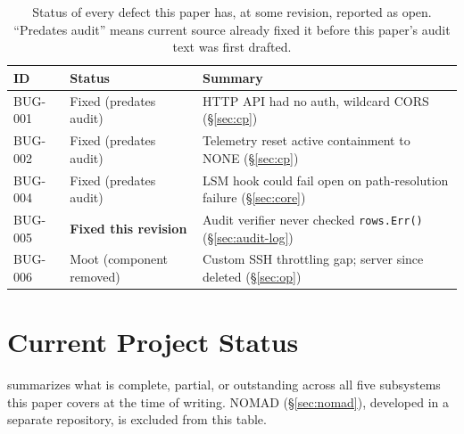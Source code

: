 \documentclass{article}
\begin{document}
\begin{table}[htbp]
\centering
\footnotesize
\caption{Status of every defect this paper has, at some revision,
reported as open. ``Predates audit'' means current source already
fixed it before this paper's audit text was first drafted.}
\label{tab:bugs}
\begin{tabular}{@{}p{1.5cm}p{1.9cm}p{3.9cm}@{}}
\toprule
ID & Status & Summary \\
\midrule
BUG-001 & Fixed (predates audit) & HTTP API had no auth, wildcard CORS (\S\ref{sec:cp}) \\
BUG-002 & Fixed (predates audit) & Telemetry reset active containment to NONE (\S\ref{sec:cp}) \\
BUG-004 & Fixed (predates audit) & LSM hook could fail open on path-resolution failure (\S\ref{sec:core}) \\
BUG-005 & \textbf{Fixed this revision} & Audit verifier never checked \texttt{rows.Err()} (\S\ref{sec:audit-log}) \\
BUG-006 & Moot (component removed) & Custom SSH throttling gap; server since deleted (\S\ref{sec:op}) \\
\bottomrule
\end{tabular}
\end{table}

\section{Current Project Status}
\label{sec:status}

 summarizes what is complete, partial, or outstanding
across all five subsystems this paper covers at the time of writing.
NOMAD (\S\ref{sec:nomad}), developed in a separate repository, is
excluded from this table.
\end{document}
